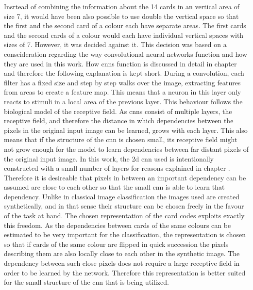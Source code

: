 Insrtead of combining the information about the 14 cards in an vertical area of size 7, it would have been also possible to use double the vertical space so that the first and the second card of a colour each have separate areas. The first cards and the second cards of a colour would each have individual vertical spaces with sizes of 7. However, it was decided against it. This decision was based on a conscideration regarding the way convolutional neural networks function and how they are used in this work. How cnns function is discussed in detail in chapter  and therefore the following explanation is kept short. During a convolution, each filter has a fixed size and step by step walks over the image, extracting features from areas to create a feature map. This means that a neuron in this layer only reacts to stimuli in a local area of the previous layer.  This behaviour follows the biological model of the receptive field. As cnns consist of multiple layers, the receptive field, and therefore the distance in which dependencies between the pixels in the original input image can be learned, grows with each layer. This also means that if the structure of the cnn is chosen small, its receptive field might not grow enough for the model to learn dependencies between far distant pixels of the original input image. In this work, the 2d cnn used is intentionally constructed with a small number of layers for reasons explained in chapter . Therefore it is desireable that pixels in between an important dependency can be assumed are close to each other so that the small cnn is able to learn that dependency. %
Unlike in classical image classification the images used are created synthetically, and in that sense their structure can be chosen freely in the favour of the task at hand. The chosen representation of the card codes exploits exactly this freedom. As the dependencies between cards of the same colours can be estimated to be very important for the classification, the representation is chosen so that if cards of the same colour are flipped in quick succession the pixels describing them are also locally close to each other in the synthetic image. The dependency between such close pixels does not require a large receptive field in order to be learned by the network. Therefore this representation is better suited for the small structure of the cnn that is being utilized. 




